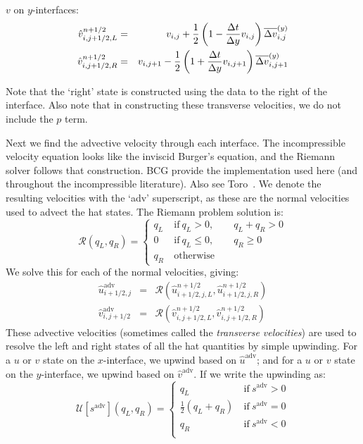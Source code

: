 \noindent $v$ on $y$-interfaces:
\begin{eqnarray}
\hat{v}_{i,j+1/2,L}^{n+1/2} &=&
   v_{i,j} + \frac{1}{2} \left ( 1 - \frac{\Delta t}{\Delta y} v_{i,j} \right )
       \Dvy_{i,j} \\ 
%
\hat{v}_{i,j+1/2,R}^{n+1/2} &=&
   v_{i,j+1} - \frac{1}{2} \left ( 1 + \frac{\Delta t}{\Delta y} v_{i,j+1} \right )
       \Dvy_{i,j+1} 
\end{eqnarray}

Note that the `right' state is constructed using the data to the right
of the interface.  Also note that in constructing these transverse
velocities, we do not include the $p$ term.

Next we find the advective velocity through each interface.  
The incompressible
velocity equation looks like the inviscid Burger's equation, and the
Riemann solver follows that construction.  BCG provide the implementation
used here (and throughout the incompressible literature).  Also see Toro~\cite{toro:1997}.
We denote the resulting velocities with the `adv' superscript, as these
are the normal velocities used to advect the hat states.  The Riemann
problem solution is:
\begin{equation}
\mathcal{R}(q_L,q_R) = \left \{ \begin{array}{cl}
   q_L  & \mathrm{~if~} q_L > 0, \qquad q_L + q_R > 0 \\
   0          & \mathrm{~if~} q_L \le 0, \qquad q_R \ge 0 \\
   q_R  & \mathrm{~otherwise}
  \end{array}
  \right .
\end{equation}
We solve this for each of the normal velocities, giving:
\begin{eqnarray}
\hat{u}^\mathrm{adv}_{i+1/2,j} &=& 
    \mathcal{R}(\hat{u}_{i+1/2,j,L}^{n+1/2}, \hat{u}_{i+1/2,j,R}^{n+1/2}) \\
%
\hat{v}^\mathrm{adv}_{i,j+1/2} &=& 
    \mathcal{R}(\hat{v}_{i,j+1/2,L}^{n+1/2}, \hat{v}_{i,j+1/2,R}^{n+1/2})
\end{eqnarray}
These advective velocities (sometimes called the {\em transverse
  velocities}) are used to resolve the left and right states of all the
hat quantities by simple upwinding.  For a $u$ or $v$ state on the
$x$-interface, we upwind based on $\hat{u}^\mathrm{adv}$; and for a
$u$ or $v$ state on the $y$-interface, we upwind based on
$\hat{v}^\mathrm{adv}$.  If we write the upwinding as:
\begin{equation}
\mathcal{U}[s^\mathrm{adv}](q_L, q_R) =
  \left \{
  \begin{array}{cl}
  q_L                    & \mathrm{~if~} s^\mathrm{adv} > 0 \\
  \frac{1}{2}(q_L + q_R) & \mathrm{~if~} s^\mathrm{adv} = 0 \\
  q_R                    & \mathrm{~if~} s^\mathrm{adv} < 0 \\
  \end{array}
  \right .
\end{equation}
